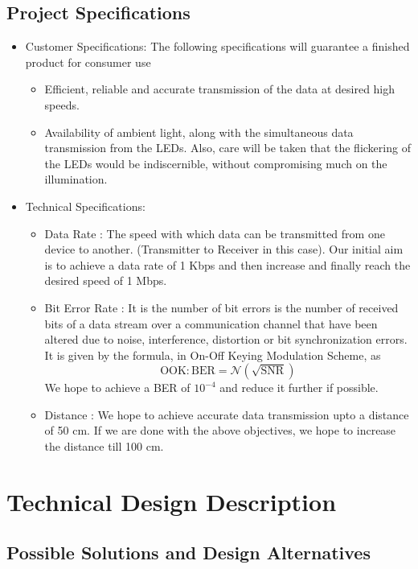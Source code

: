 \documentclass{article}
\begin{document}
\subsection{Project Specifications}
\begin{itemize}
\item Customer Specifications: The following specifications will guarantee a finished product for consumer use
  \begin{itemize}
  \item Efficient, reliable and accurate transmission of the data at desired high speeds.
  \item Availability of ambient light, along with the simultaneous data transmission from the LEDs. Also, care will be taken that the flickering of the LEDs would be indiscernible, without compromising much on the illumination.  
  \end{itemize}
\item Technical Specifications: 
  \begin{itemize}
  \item Data Rate : The speed with which data can be transmitted from one device to another. (Transmitter to Receiver in this case). Our initial aim is to achieve a data rate of 1 Kbps and then increase and finally reach the desired speed of 1 Mbps.
  \item Bit Error Rate : It is the number of bit errors is the number of received bits of a data stream over a communication channel that have been altered due to noise, interference, distortion or bit synchronization errors. It is given by the formula, in On-Off Keying Modulation Scheme, as $$\textrm{OOK} : \textrm{BER} = \mathcal{N}(\sqrt{\textrm{SNR}})$$ We hope to achieve a BER of $10^{-4}$ and reduce it further if possible.
  \item Distance : We hope to achieve accurate data transmission upto a distance of 50 cm. If       we are done with the above objectives, we hope to increase the distance till 100 cm.  
  \end{itemize}
\end{itemize}

\section{Technical Design Description}
\subsection{Possible Solutions and Design Alternatives}
\end{document}
